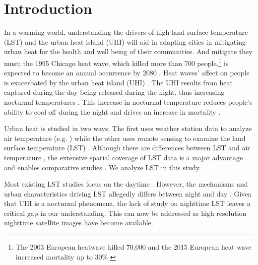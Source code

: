 \documentclass[final,3p,times,twocolumn,sort&compress]{elsarticle}
\begin{document}
\linenumbers

\section{Introduction}
In a warming world, understanding the drivers of high land surface temperature (LST) and the urban heat island (UHI) will aid in adapting cities in mitigating urban heat for the health and well being of their communities.
And mitigate they must; the 1995 Chicago heat wave, which killed more than 700 people,\footnote{The 2003 European heatwave killed 70,000 \cite{Robine2008-ky} and the 2015 European heat wave increased mortality up to 30\% \cite{Vicedo-Cabrera2016-si}} is expected to become an annual occurrence by 2080 \cite{klinenberg2015heat}. 
Heat waves' affect on people is exacerbated by the urban heat island (UHI) \cite{Wicki2017-fv, Echevarria_Icaza2016-fr}.
The UHI results from heat captured during the day being released during the night, thus increasing nocturnal temperatures \cite{Oke2002-ta, Landsberg1981-mq, Rotach2005-yu}.
This increase in nocturnal temperature reduces people's ability to cool off during the night and drives an increase in mortality \cite{Echevarria_Icaza2016-fr, Murage2017-wj}.

Urban heat is studied in two ways.
The first uses weather station data to analyze air temperature (e.g. \cite{Scott2016-lc}) while the other uses remote sensing to examine the land surface temperature (LST) \cite{Imhoff2010-lf, Peng2012-iy, Peng2018-cp, Zhou2014-wc, Voogt2003-mm}.
Although there are differences between LST and air temperature \cite{Good2016-yk}, the extensive spatial coverage of LST data is a major advantage and enables comparative studies \cite{Hung2006-qy}.
We analyze LST in this study.

Most existing LST studies focus on the daytime \cite{Peng2018-cp,Chun2018-so,Wang2019-water,Zhou2018-iy}.
However, the mechanisms and urban characteristics driving LST allegedly differs between night and day \cite{Hung2006-qy, Chun2017-mm, Nichol2005-mm, Wicki2017-fv, Echevarria_Icaza2016-fr,Sobstyl2018-wt, Peng2012-iy, Zhou2014-wc, Zhao2017-cc}. 
Given that UHI is a nocturnal phenomena, the lack of study on nighttime LST leaves a critical gap in our understanding. 
This can now be addressed as high resolution nighttime satellite images have become available.
\end{document}
